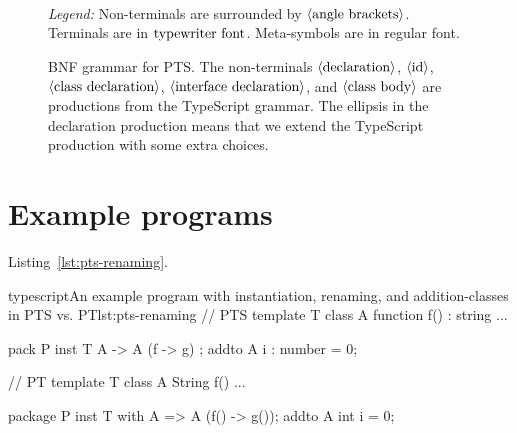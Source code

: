 \begin{figure}
\begin{bnf*}
        {  \bnfsp \bnfts{->} \bnfsp {} }\\
        {  \bnfsp {} \bnfsp {} \bnfsp {} }\\
        {  \bnfor \bnfes }\\
    \end{bnf*}
    \caption{BNF grammar for PTS. The non-terminals $\langle \textrm{declaration} \rangle$, $\langle \textrm{id} \rangle$, $\langle \textrm{class declaration} \rangle$, $\langle \textrm{interface declaration} \rangle$, and $\langle \textrm{class body} \rangle$ are productions from the TypeScript grammar.
    The ellipsis in the declaration production means that we extend the TypeScript production with some extra choices.}

    \textit{Legend:} Non-terminals are surrounded by $\langle \textrm{angle brackets} \rangle$.
    Terminals are in $\textrm{typewriter font}$.
    Meta-symbols are in regular font.
    \label{fig:pts-grammar}
\end{figure}

\section{Example programs}\label{sec:example-programs}

Listing~\vref{lst:pts-renaming}.

\begin{code}{typescript}{An example program with instantiation, renaming, and addition-classes in PTS vs. PT}{lst:pts-renaming}
    // PTS
    template T {
        class A {
            function f() : string {
                ...
            }
        }
    }

    pack P {
        inst T { A -> A (f -> g) };
        addto A {
            i : number = 0;
        }
    }

    // PT
    template T {
        class A {
            String f() {
                ...
            }
        }
    }

    package P {
        inst T with A => A (f() -> g());
        addto A {
            int i = 0;
        }
    }
\end{code}
